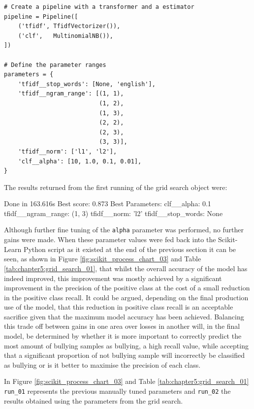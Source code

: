\begin{lstlisting}[caption={Using grid search to fine tune parameter values}, label=lst:chapter5.4:snipet_01]
# Create a pipeline with a transformer and a estimator
pipeline = Pipeline([
    ('tfidf', TfidfVectorizer()),
    ('clf',   MultinomialNB()),
])

# Define the parameter ranges
parameters = {
    'tfidf__stop_words': [None, 'english'],
    'tfidf__ngram_range': [(1, 1),
                           (1, 2),
                           (1, 3),
                           (2, 2),
                           (2, 3),
                           (3, 3)],
    'tfidf__norm': ['l1', 'l2'],
    'clf__alpha': [10, 1.0, 0.1, 0.01],
}
\end{lstlisting}

The results returned from the first running of the grid search object were:

\begin{spverbatim}
Done in 163.616s
Best score: 0.873
Best Parameters:
    clf__alpha:         0.1
    tfidf__ngram_range: (1, 3)
    tfidf__norm:        'l2'
    tfidf__stop_words:  None
\end{spverbatim}
 
Although further fine tuning of the \verb|alpha| parameter was performed, no further gains were made. When these parameter values were fed back into the Scikit-Learn Python script as it existed at the end of the previous section it can be seen, as shown in Figure \ref{fig:scikit_process_chart_03} and Table \ref{tab:chapter5:grid_search_01}, that whilst the overall accuracy of the model has indeed improved, this improvement was mostly achieved by a significant improvement in the precision of the positive class at the cost of a small reduction in the positive class recall. It could be argued, depending on the final production use of the model, that this reduction in positive class recall is an acceptable sacrifice given that the maximum model accuracy has been achieved. Balancing this trade off between gains in one area over losses in another will, in the final model, be determined by whether it is more important to correctly predict the most amount of bullying samples as bullying, a high recall value, while accepting that a significant proportion of not bullying sample will incorrectly be classified as bullying or is it better to maximise the precision of each class.

In Figure \ref{fig:scikit_process_chart_03} and Table \ref{tab:chapter5:grid_search_01} \verb|run_01| represents the previous manually tuned parameters and \verb|run_02| the results obtained using the parameters from the grid search.

